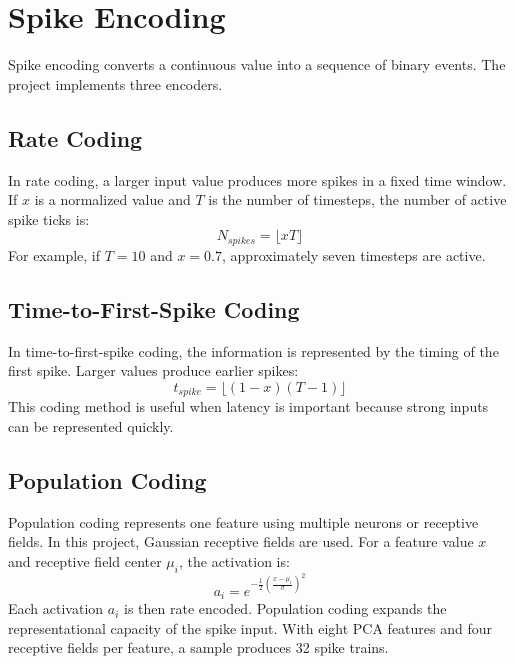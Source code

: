 \section{Spike Encoding}

Spike encoding converts a continuous value into a sequence of binary events. The project implements three encoders.

\subsection{Rate Coding}

In rate coding, a larger input value produces more spikes in a fixed time window. If $x$ is a normalized value and $T$ is the number of timesteps, the number of active spike ticks is:
\begin{equation}
N_{spikes} = \lfloor xT \rfloor
\end{equation}
For example, if $T=10$ and $x=0.7$, approximately seven timesteps are active.

\subsection{Time-to-First-Spike Coding}

In time-to-first-spike coding, the information is represented by the timing of the first spike. Larger values produce earlier spikes:
\begin{equation}
t_{spike} = \lfloor (1 - x)(T - 1) \rfloor
\end{equation}
This coding method is useful when latency is important because strong inputs can be represented quickly.

\subsection{Population Coding}

Population coding represents one feature using multiple neurons or receptive fields. In this project, Gaussian receptive fields are used. For a feature value $x$ and receptive field center $\mu_i$, the activation is:
\begin{equation}
a_i = e^{-\frac{1}{2}\left(\frac{x-\mu_i}{\sigma}\right)^2}
\end{equation}
Each activation $a_i$ is then rate encoded. Population coding expands the representational capacity of the spike input. With eight PCA features and four receptive fields per feature, a sample produces 32 spike trains.

